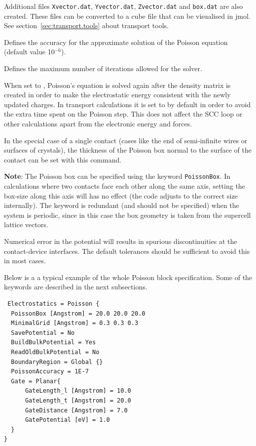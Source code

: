 \begin{description}
  Additional files \verb|Xvector.dat|, \verb|Yvector.dat|, \verb|Zvector.dat|
  and \verb|box.dat| are also created. These files can be converted to a cube
  file that can be visualised in jmol. See section~\ref{sec:transport.tools}
  about transport tools.
\item[\is{PoissonAccuracy}] Defines the accuracy for the approximate solution of
  the Poisson equation (default value 10$^{-6}$).
\item[\is{MaxPoissonIterations}] Defines the maximum number of iterations allowed
  for the solver.
\item[\is{RecomputeAfterDensity}] When set to , Poisson's equation is
  solved again after the density matrix is created in order to make the
  electrostatic energy consistent with the newly updated charges.  In transport
  calculations it is set to  by default in order to avoid the extra time
  spent on the Poisson step. This does not affect the SCC loop or other
  calculations apart from the electronic energy and forces.
\item[\is{PoissonThickness}] In the special case of a single contact (cases like
  the end of semi-infinite wires or surfaces of crystals), the thickness of the
  Poisson box normal to the surface of the contact can be set with this command.
\end{description}

{\bf Note}: The Poisson box can be specified using the keyword
\verb|PoissonBox|. In calculations where two contacts face each other along the
same axis, setting the box-size along this axis will has no effect (the code
adjusts to the correct size internally). The  keyword is
redundant (and should not be specified) when the system is periodic, since in
this case the box geometry is taken from the supercell lattice vectors.

Numerical error in the potential will results in spurious discontinuities at the
contact-device interfaces. The default tolerances should be sufficient to avoid
this in most cases.

Below is a a typical example of the whole Poisson block specification. Some of
the keywords are described in the next subsections.
\begin{verbatim}
 Electrostatics = Poisson {
  PoissonBox [Angstrom] = 20.0 20.0 20.0
  MinimalGrid [Angstrom] = 0.3 0.3 0.3
  SavePotential = No
  BuildBulkPotential = Yes
  ReadOldBulkPotential = No
  BoundaryRegion = Global {}
  PoissonAccuracy = 1E-7
  Gate = Planar{
      GateLength_l [Angstrom] = 10.0
      GateLength_t [Angstrom] = 20.0
      GateDistance [Angstrom] = 7.0
      GatePotential [eV] = 1.0
  }
}
\end{verbatim}

